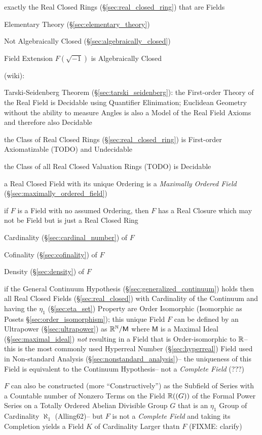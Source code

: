 exactly the Real Closed Rings (\S\ref{sec:real_closed_ring}) that are Fields

Elementary Theory (\S\ref{sec:elementary_theory})

Not Algebraically Closed (\S\ref{sec:algebraically_closed})

Field Extension $F(\sqrt{-1})$ is Algebraically Closed

(wiki):

Tarski-Seidenberg Theorem (\S\ref{sec:tarski_seidenberg}): the First-order
Theory of the Real Field is Decidable using Quantifier Elinimation; Euclidean
Geometry without the ability to measure Angles is also a Model of the Real
Field Axioms and therefore also Decidable

the Class of Real Closed Rings (\S\ref{sec:real_closed_ring}) is First-order
Axiomatizable (TODO) and Undecidable

the Class of all Real Closed Valuation Rings (TODO) is Decidable

a Real Closed Field with its unique Ordering is a \emph{Maximally Ordered
  Field} (\S\ref{sec:maximally_ordered_field})

if $F$ is a Field with no assumed Ordering, then $F$ has a Real Closure which
may not be Field but is just a Real Closed Ring

Cardinality (\S\ref{sec:cardinal_number}) of $F$

Cofinality (\S\ref{sec:cofinality}) of $F$

Density (\S\ref{sec:density}) of $F$

if the General Continuum Hypothesis (\S\ref{sec:generalized_continuum}) holds
then all Real Closed Fields (\S\ref{sec:real_closed}) with Cardinality of the
Continuum and having the $\eta_1$ (\S\ref{sec:eta_set}) Property are Order
Isomorphic (Isomorphic as Posets \S\ref{sec:order_isomorphism});
this unique Field $F$ can be defined by an Ultrapower (\S\ref{sec:ultrapower})
as $\mathbb{R}^{\mathbb{N}} / \mathsf{M}$ where $\mathsf{M}$ is a Maximal Ideal
(\S\ref{sec:maximal_ideal}) \emph{not} resulting in a Field that is
Order-isomorphic to $\mathbb{R}$-- this is the most commonly used Hyperreal Number
(\S\ref{sec:hyperreal}) Field used in Non-standard Analysis
(\S\ref{sec:nonstandard_analysis})-- the uniqueness of this Field is equivalent
to the Continuum Hypothesis-- not a \emph{Complete Field} (???) %

$F$ can also be constructed (more ``Constructively'') as the Subfield of Series
with a Countable number of Nonzero Terms on the Field $\mathbb{R}((G))$ of the
Formal Power Series on a Totally Ordered Abelian Divisible Group $G$ that is an
$\eta_1$ Group of Cardinality $\aleph_1$ (Alling62)-- but $F$ is not a
\emph{Complete Field} and taking its Completion yields a Field $K$ of
Cardinality Larger thatn $F$ (FIXME: clarify)

